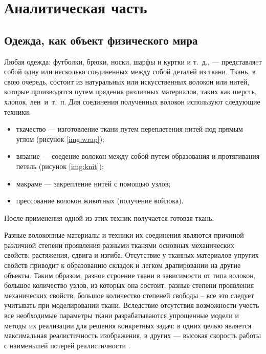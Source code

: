 \chapter{Аналитическая часть}

\section{Одежда, как объект физического мира}

Любая одежда: футболки, брюки, носки, шарфы и куртки и т.~д., --- представляeт
собой одну или несколько соединенных между собой деталей из ткани. Ткань, в свою
очередь, состоит из натуральных или искусственных волокон или нитей, которые
производятся путем прядения различных материалов, таких как шерсть, хлопок,
лен~и~т.~п. Для соединения полученных волокон используют следующие техники:
\begin{itemize}[left=\parindent]
    \item ткачество --- изготовление ткани путем переплетения нитей под прямым
        углом (рисунок \ref{img:wrap});
    \item вязание --- соедение волокон между собой путем образования и
        протягивания петель (рисунок \ref{img:knit});
    \item макраме --- закрепление нитей с помощью узлов;
    \item прессование волокон животных (получение войлока).
\end{itemize}
После применения одной из этих техник получается готовая ткань.



Разные волоконные материалы и техники их соединения являются причиной различной
степени проявления разными тканями основных механических свойств: растяжения,
сдвига и изгиба. Отсутствие у тканных материалов упругих свойств приводит к
образованию складок и легком драпировании на другие объекты. Таким образом,
разное строение ткани в зависимости от типа волокон, большое количество узлов,
из которых она состоит, разные степени проявления механических свойств, большое
количество степеней свободы -- все это следует учитывать при моделировании
ткани. Вследствие отсутствия возможности учесть все необходимые параметры ткани
разрабатываются упрощенные модели и методы их реализации для решения конкретных
задач: в одних целью является максимальная реалистичность изображения, в других
--- высокая скорость работы с наименьшей потерей реалистичности \cite{bib11}.

